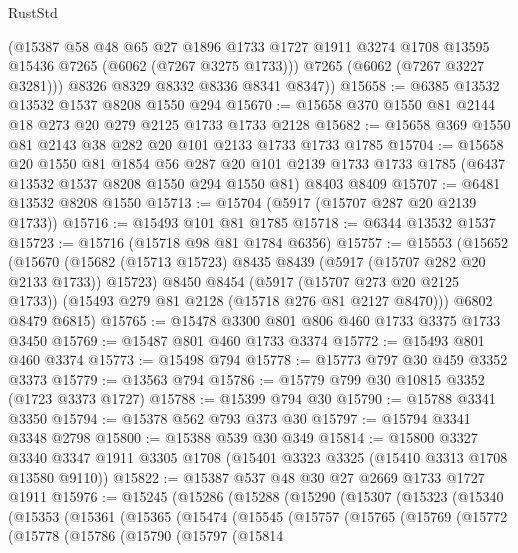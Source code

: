 \begin{lexlean}{RustStd}
\begin{coremodule}
          (@15387
            @58
            @48
            @65
            @27
            @1896
            @1733
            @1727
            @1911
            @3274
            @1708
            @13595
            @15436
            @7265
            (@6062 (@7267 @3275 @1733)))
          @7265
          (@6062 (@7267 @3227 @3281)))
        @8326
        @8329
        @8332
        @8336
        @8341
        @8347))
@15658 := @6385 @13532 @13532 @1537 @8208 @1550 @294
@15670 := @15658 @370 @1550 @81 @2144 @18 @273 @20 @279 @2125 @1733 @1733 @2128
@15682 := @15658 @369 @1550 @81 @2143 @38 @282 @20 @101 @2133 @1733 @1733 @1785
@15704 := @15658
    @20
    @1550
    @81
    @1854
    @56
    @287
    @20
    @101
    @2139
    @1733
    @1733
    @1785
    (@6437 @13532 @1537 @8208 @1550 @294 @1550 @81)
    @8403
    @8409
@15707 := @6481 @13532 @8208 @1550
@15713 := @15704 (@5917 (@15707 @287 @20 @2139 @1733))
@15716 := @15493 @101 @81 @1785
@15718 := @6344 @13532 @1537
@15723 := @15716 (@15718 @98 @81 @1784 @6356)
@15757 := @15553
    (@15652
      (@15670
        (@15682 (@15713 @15723) @8435 @8439 (@5917 (@15707 @282 @20 @2133 @1733)) @15723)
        @8450
        @8454
        (@5917 (@15707 @273 @20 @2125 @1733))
        (@15493 @279 @81 @2128 (@15718 @276 @81 @2127 @8470)))
      @6802
      @8479
      @6815)
@15765 := @15478 @3300 @801 @806 @460 @1733 @3375 @1733 @3450
@15769 := @15487 @801 @460 @1733 @3374
@15772 := @15493 @801 @460 @3374
@15773 := @15498 @794
@15778 := @15773 @797 @30 @459 @3352 @3373
@15779 := @13563 @794
@15786 := @15779 @799 @30 @10815 @3352 (@1723 @3373 @1727)
@15788 := @15399 @794 @30
@15790 := @15788 @3341 @3350
@15794 := @15378 @562 @793 @373 @30
@15797 := @15794 @3341 @3348 @2798
@15800 := @15388 @539 @30 @349
@15814 := @15800
    @3327
    @3340
    @3347
    @1911
    @3305
    @1708
    (@15401 @3323 @3325 (@15410 @3313 @1708 @13580 @9110))
@15822 := @15387 @537 @48 @30 @27 @2669 @1733 @1727 @1911
@15976 := @15245
    (@15286
      (@15288
        (@15290
          (@15307
            (@15323
              (@15340
                (@15353
                  (@15361
                    (@15365
                      (@15474
                        (@15545
                          (@15757
                            (@15765
                              (@15769
                                (@15772
                                  (@15778
                                    (@15786
                                      (@15790
                                        (@15797
                                          (@15814

\end{coremodule}
\end{lexlean}
